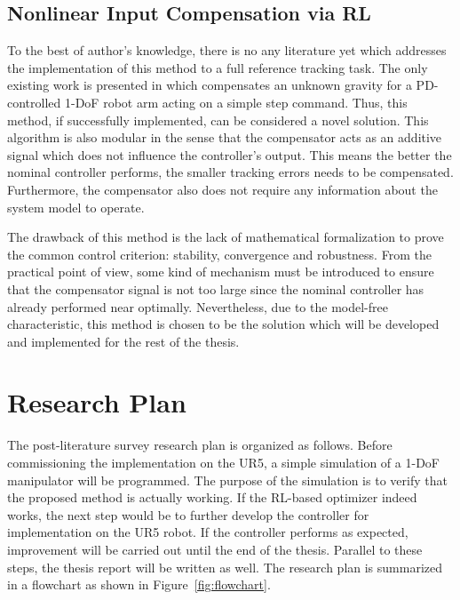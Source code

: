 \subsection{Nonlinear Input Compensation via \acs{RL}}
To the best of author's knowledge, there is no any literature yet which addresses the implementation of this method to a full reference tracking task. The only existing work is presented in \cite{Efe2014} which compensates an unknown gravity for a \ac {PD}-controlled 1-\acs {DoF} robot arm acting on a simple step command. Thus, this method, if successfully implemented, can be considered a novel solution. This algorithm is also modular in the sense that the compensator acts as an additive signal which does not influence the controller's output. This means the better the nominal controller performs, the smaller tracking errors needs to be compensated. Furthermore, the compensator also does not require any information about the system model to operate. 

The drawback of this method is the lack of mathematical formalization to prove the common control criterion: stability, convergence and robustness. From the practical point of view, some kind of mechanism must be introduced to ensure that the compensator signal is not too large since the nominal controller has already performed near optimally. Nevertheless, due to the model-free characteristic, this method is chosen to be the solution which will be developed and implemented for the rest of the thesis.

\section{Research Plan} \label{sec:res_planning}
The post-literature survey research plan is organized as follows. Before commissioning the implementation on the UR5, a simple simulation of a 1-\acs {DoF} manipulator will be programmed. The purpose of the simulation is to verify that the proposed method is actually working. If the \acs{RL}-based optimizer indeed works, the next step would be to further develop the controller for implementation on the UR5 robot. If the controller performs as expected, improvement will be carried out until the end of the thesis. Parallel to these steps, the thesis report will be written as well. The research plan is summarized in a flowchart as shown in Figure~\ref{fig:flowchart}.


